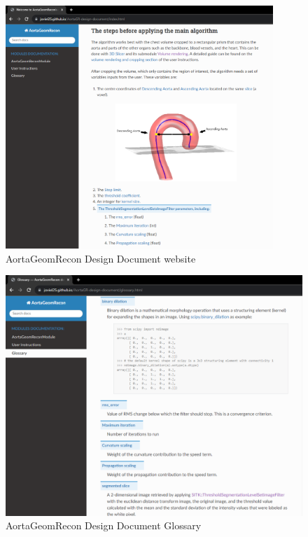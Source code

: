 \begin{figure}[H]
    \centering
    \includegraphics[width=0.9\textwidth]{figures/AC/DD/Main_page.png}
    \caption[AortaGeomRecon Design Document website]{AortaGeomRecon Design Document website}
    \label{fig_agr_dd}
\end{figure}

\begin{figure}[H]
    \centering
    \includegraphics[width=\textwidth]{figures/AC/DD/Glossary.png}
    \caption[AortaGeomRecon Design Document Glossary]{AortaGeomRecon Design Document Glossary}
    \label{fig_agr_dd_glossary}
\end{figure}

